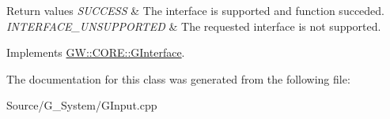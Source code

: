 \begin{DoxyRetVals}{Return values}
{\em S\+U\+C\+C\+E\+SS} & The interface is supported and function succeded. \\
\hline
{\em I\+N\+T\+E\+R\+F\+A\+C\+E\+\_\+\+U\+N\+S\+U\+P\+P\+O\+R\+T\+ED} & The requested interface is not supported. \\
\hline
\end{DoxyRetVals}


Implements \hyperlink{classGW_1_1CORE_1_1GInterface_ad6c8324970172784964f484686d4fdad}{G\+W\+::\+C\+O\+R\+E\+::\+G\+Interface}.



The documentation for this class was generated from the following file\+:\begin{DoxyCompactItemize}
\item 
Source/\+G\+\_\+\+System/G\+Input.\+cpp\end{DoxyCompactItemize}
